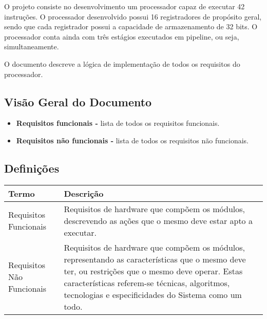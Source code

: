 \documentclass{report}
\begin{document}
  O projeto consiste no desenvolvimento um processador capaz de executar 42 instruções. O processador desenvolvido possui 16 registradores de propósito geral, sendo que cada registrador possui a capacidade de armazenamento de 32 bits. O processador conta ainda com três estágios executados em pipeline, ou seja, simultaneamente.
  
  O documento descreve a lógica de implementação de todos os requisitos do processador.

\subsection{Visão Geral do Documento}
  \begin{itemize}
   \item \textbf{Requisitos funcionais -} lista de todos os requisitos funcionais.
   \item \textbf{Requisitos não funcionais -} lista de todos os requisitos não funcionais.
  \end{itemize}

  \subsection{Definições}
    \FloatBarrier
    \begin{table}[H]
      \begin{center}
        \begin{tabular}[pos]{|m{5cm} | m{9cm}|} 
          \hline
          \cellcolor[gray]{0.9}\textbf{Termo} & \cellcolor[gray]{0.9}\textbf{Descrição} \\ \hline
          Requisitos Funcionais & Requisitos de hardware que compõem os módulos, descrevendo as ações que o mesmo deve estar apto a executar.   \\ \hline
          Requisitos Não Funcionais & Requisitos de hardware que compõem os módulos, representando as características que o mesmo deve ter, ou restrições que o mesmo deve operar. Estas características referem-se técnicas, algoritmos, tecnologias e especificidades do Sistema como um todo.  \\ \hline
        \end{tabular}
      \end{center}
    \end{table}  

\end{document}
